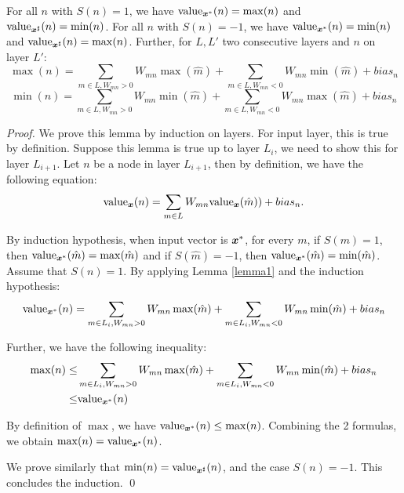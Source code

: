 \begin{lemma}
	\label{lem:key1}
	\label{lemma2}
For all $n$ with $S(n)=1$, we have ${\textrm{value}}_{\boldsymbol{x}^*}(n) = \max(n)$
and ${\textrm{value}}_{\boldsymbol{x}^{\sharp}}(n) = \min(n)$.
For all $n$ with $S(n)=-1$, we have ${\textrm{value}}_{\boldsymbol{x}^*}(n) = \min(n)$
and ${\textrm{value}}_{\boldsymbol{x}^{\sharp}}(n) = \max(n)$. Further, for $L,L'$ two consecutive layers and $n$ on layer $L'$:
$$\max(n)=\sum_{m \in L, W_{mn}>0}W_{mn} \max(\hat{m}) + \sum_{m \in L, W_{mn}<0}W_{mn} \min(\hat{m}) + bias_n$$
$$\min(n)=\sum_{m \in L, W_{mn}>0}W_{mn} \min(\hat{m}) + \sum_{m \in L, W_{mn}<0}W_{mn} \max(\hat{m}) + bias_n$$

\end{lemma}

\begin{proof}
	We prove this lemma by induction on layers. For input layer, this is true by definition. Suppose this lemma is true up to layer $L_i$, we need to show this for layer $L_{i+1}$. Let $n$ be a node in layer $L_{i+1}$, then by definition, we have the following equation: \begin{align*}
		{\textrm{value}}_{\boldsymbol{x}}(n) = \sum_{m\in L}W_{m n}{\textrm{value}}_{\boldsymbol{x}}(\hat{m})) + bias_n.
	\end{align*}
	
	By induction hypothesis, when input vector is $\boldsymbol{x}^{*}$, for every $m$, if $S(m)=1$, then ${\textrm{value}}_{\boldsymbol{x}^*}(\hat{m})=\max(\hat{m})$ and if $S(\hat{m})=-1$, then ${\textrm{value}}_{\boldsymbol{x}^*}(\hat{m})=\min(\hat{m})$. Assume that $S(n)=1$. By applying Lemma \ref{lemma1} and the induction hypothesis:
	\begin{align*}
		{\textrm{value}}_{\boldsymbol{x}^*}(n) = \sum_{m \in L_i, W_{mn}>0}W_{mn} \max(\hat{m}) + \sum_{m \in L_i, W_{mn}<0}W_{mn} \min(\hat{m}) + bias_n\\
	\end{align*}
	


	Further, we have the following inequality:
	\begin{align*}
		\max(n)\leq & \sum_{m \in L_i, W_{mn }>0}W_{mn} \max(\hat{m}) + \sum_{m \in L_i, W_{mn}<0}W_{mn} \min(\hat{m}) + bias_n\\
		\leq & {\textrm{value}}_{\boldsymbol{x}^*}(n)
	\end{align*}
	
	
	By definition of $\max$, we have ${\textrm{value}}_{\boldsymbol{x}^*}(n) \leq \max(n)$.
	Combining the 2 formulas, we obtain $\max(n)={\textrm{value}}_{\boldsymbol{x}^*}(n)$. 
	
	We prove similarly that $\min(n)={\textrm{value}}_{\boldsymbol{x}^\sharp}(n)$,
	and the case $S(n)=-1$. This concludes the induction. \qed
\end{proof}

